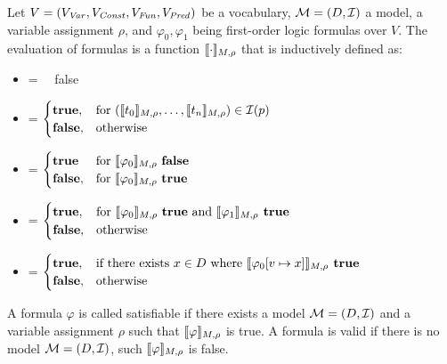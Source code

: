 \begin{mydef}
		Let $V = (V_{\mathit{Var}}, V_{\mathit{Const}}, V_{\mathit{Fun}}, V_{\mathit{Pred}})$ be a vocabulary, $\mathcal{M} = (D, \mathcal{I})$ a model, a variable assignment $\rho$, and $\varphi_0, \varphi_1$ being first-order logic formulas over $V$. The evaluation of formulas is a function $\llbracket \cdot \rrbracket_{M, \rho}$ that is inductively defined as: \\
		\begin{itemize}
			\item {\makebox[3.5cm]{$\eval{\bot} = \hfill$}} = \ \ false
			\item {} =
				$
				\begin{cases}
					\textbf{true}, & \text{for } (\llbracket t_0 \rrbracket_{M, \rho}, \ldots, \llbracket t_n \rrbracket_{M, \rho}) \in \mathcal{I}(p)\\
					\textbf{false}, & \text{otherwise}
				\end{cases}
				$
			\item {} =
				$
				\begin{cases}
					\textbf{true} & \text{for } \llbracket \varphi_0 \rrbracket_{M, \rho} \text{ \textbf{false}}\\
					\textbf{false}, & \text{for } \llbracket \varphi_0 \rrbracket_{M, \rho} \text{ \textbf{true}}\\
				\end{cases}
				$
			\item {} =
				$
				\begin{cases}
					\textbf{true}, & \text{for } \llbracket \varphi_0 \rrbracket_{M, \rho} \text{ \textbf{true} and } \llbracket \varphi_1 \rrbracket_{M, \rho} \textbf{ true} \\
					\textbf{false}, & \text{otherwise} \\
				\end{cases}
				$
			\item {} =
				$
				\begin{cases}
					\textbf{true}, & \text{if there exists } x \in D \text{ where } \llbracket \varphi_0 [v \mapsto x] \rrbracket_{M, \rho} \textbf{ true} \\
					\textbf{false}, & \text{otherwise} \\
				\end{cases}
				$
		\end{itemize}
\end{mydef}
A formula $\varphi$ is called satisfiable if there exists a model $\mathcal{M} = (D, \mathcal{I})$ and a variable assignment $\rho$ such that $\llbracket \varphi \rrbracket_{M, \rho}$ is true. A formula is valid if there is no model $\mathcal{M} = (D, \mathcal{I})$, such $\llbracket \varphi \rrbracket_{M, \rho}$ is false.
